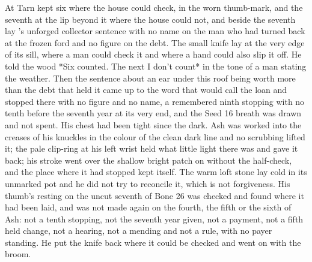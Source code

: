 At  Tarn kept six where the house could check, in the worn thumb-mark, and the seventh at the lip beyond it where the house could not, and beside the seventh lay 's unforged collector sentence with no name on the man who had turned back at the frozen ford and no figure on the debt. The small knife lay at the very edge of its sill, where a man could check it and where a hand could also slip it off. He told the wood *Six counted. The next I don't count* in the tone of a man stating the weather. Then the sentence about an ear under this roof being worth more than the debt that held it came up to the word that would call the loan and stopped there with no figure and no name, a remembered ninth stopping with no tenth before the seventh year at its very end, and the Seed 16 breath was drawn and not spent. His chest had been tight since the dark. Ash was worked into the creases of his knuckles in the colour of the clean dark line and no scrubbing lifted it; the pale clip-ring at his left wrist held what little light there was and gave it back; his stroke went over the shallow bright patch on  without the half-check, and the place where it had stopped kept itself. The warm loft stone lay cold in its unmarked pot and he did not try to reconcile it, which is not forgiveness. His thumb's resting on the uncut seventh of Bone 26 was checked and found where it had been laid, and was not made again on the fourth, the fifth or the sixth of Ash: not a tenth stopping, not the seventh year given, not a payment, not a fifth held change, not a hearing, not a mending and not a rule, with no payer standing. He put the knife back where it could be checked and went on with the broom.

